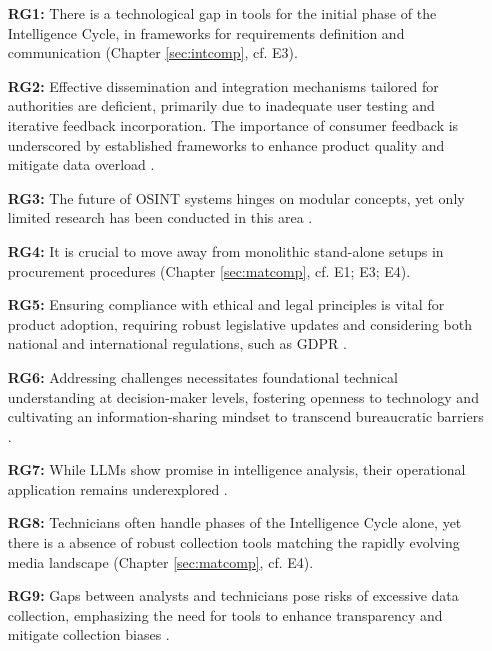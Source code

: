 \documentclass[10pt]{article}
\begin{document}
\begin{itemize}
    \item[\textbf{RG1:}] There is a technological gap in tools for the initial phase of the Intelligence Cycle, in frameworks for requirements definition and communication (Chapter \ref{sec:intcomp}, cf. E3).

        \item[\textbf{RG2:}]Effective dissemination and integration mechanisms tailored for authorities are deficient, primarily due to inadequate user testing and iterative feedback incorporation. The importance of consumer feedback is underscored by established frameworks to enhance product quality and mitigate data overload \cite{JointChiefsofStaffU.S.Army.2013, NorthAtlanticTreatyOrganization.2001}.

    \item[\textbf{RG3:}] The future of OSINT systems hinges on modular concepts, yet only limited research has been conducted in this area \cite{Arjun.2020,Wright.2020}.

    \item[\textbf{RG4:}] It is crucial to move away from monolithic stand-alone setups in procurement procedures (Chapter \ref{sec:matcomp}, cf. E1; E3; E4).

    \item[\textbf{RG5:}] Ensuring compliance with ethical and legal principles is vital for product adoption, requiring robust legislative updates and considering both national and international regulations, such as GDPR \cite{EuropeanParliament.2016,EuropeanCommission.18.08.2023,Wittmer.2022}.

    \item[\textbf{RG6:}] Addressing challenges necessitates foundational technical understanding at decision-maker levels, fostering openness to technology and cultivating an information-sharing mindset to transcend bureaucratic barriers \cite{NorthAtlanticTreatyOrganization.2001}.

    \item[\textbf{RG7:}] While LLMs show promise in intelligence analysis, their operational application remains underexplored \cite{Radford.2023}.

    \item[\textbf{RG8:}] Technicians often handle phases of the Intelligence Cycle alone, yet there is a absence of robust collection tools matching the rapidly evolving media landscape (Chapter \ref{sec:matcomp}, cf. E4).

    \item[\textbf{RG9:}] Gaps between analysts and technicians pose risks of excessive data collection, emphasizing the need for tools to enhance transparency and mitigate collection biases \cite{Lowenthal.2020}.
\end{itemize}
\end{document}
